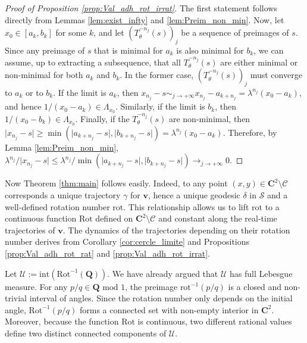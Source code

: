 \documentclass[11pt]{article}
\begin{document}
\begin{proof}[Proof of Proposition \ref{prop:Val_adh_rot_irrat}] The first statement follows directly from Lemmas \ref{lem:exist_infty} and \ref{lem:Preim_non_min}. Now, let $x_{0}\in[a_{k},b_{k}]$ for some $k$, and let $(T_{\theta}^{-n_{j}}(s))_{j}$ be a sequence of preimages of $s$. Since any preimage of $s$ that is minimal for $a_{k}$ is also minimal for $b_{k}$, we can assume, up to extracting a subsequence, that all $T_{\theta}^{-n_{j}}(s)$ are either minimal or non-minimal for both $a_{k}$ and $b_{k}$. In the former case, $(T_{\theta}^{-n_{j}}(s))_{j}$ must converge to $a_{k}$ or to $b_{k}$. If the limit is $a_{k}$, then $x_{n_{j}}-s\sim_{j\rightarrow+\infty}x_{n_{j}}-a_{k+n_{j}}=\lambda^{n_{j}}(x_{0}-a_{k})$, and hence $1/(x_{0}-a_{k})\in\Lambda_{x_{0}}$. Similarly, if the limit is $b_{k}$, then $1/(x_{0}-b_{k})\in\Lambda_{x_{0}}$. Finally, if the $T_{\theta}^{-n_{j}}(s)$ are non-minimal, then $\lvert x_{n_{j}}-s\rvert\geq\min(\lvert a_{k+n_{j}}-s\rvert,\lvert b_{k+n_{j}}-s\rvert)=\lambda^{n_{j}}(x_{0}-a_{k})$. Therefore, by Lemma \ref{lem:Preim_non_min}, $\lambda^{n_{j}}/\lvert x_{n_{j}}-s\rvert\leq\lambda^{n_{j}}/\min(\lvert a_{k+n_{j}}-s\rvert,\lvert b_{k+n_{j}}-s\rvert)\longrightarrow_{j\rightarrow+\infty}0$.
\end{proof}

Now Theorem \ref{thm:main} follows easily. Indeed, to any point $\left(x,y\right)\in\mathbf{C}^{2}\setminus\mathcal{C}$ corresponds a unique trajectory $\gamma$ for $\mathbf{v}$, hence a unique geodesic $\delta$ in $\mathcal{S}$ and a well-defined rotation number $\text{rot}$. This relationship allows us to lift $\text{rot}$ to a continuous function $\text{Rot}$ defined on $\mathbf{C}^{2}\setminus\mathcal{C}$ and constant along the real-time trajectories of $\mathbf{v}$. The dynamics of the trajectories depending on their rotation number derives from Corollary \ref{cor:cercle_limite} and Propositions \ref{prop:Val_adh_rot_rat} and \ref{prop:Val_adh_rot_irrat}. 

Let $\mathcal{U}:=\text{int}\left(\text{Rot}^{-1}\left(\mathbf{Q}\right)\right)$. We have already argued that $\mathcal{U}$ has full Lebesgue measure. For any $p/q\in\mathbf{Q}\text{ mod }1$, the preimage $\text{rot}^{-1}\left(p/q\right)$ is a closed and non-trivial interval of angles. Since the rotation number only depends on the initial angle, $\text{Rot}^{-1}\left(p/q\right)$ forms a connected set with non-empty interior in $\mathbf{C}^{2}$. Moreover, because the function $\text{Rot}$ is continuous, two different rational values define two distinct connected components of $\mathcal{U}$.
\end{document}
